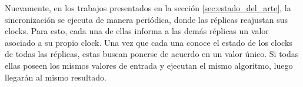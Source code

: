 


Nuevamente, en los trabajos presentados en la sección \ref{sec:estado_del_arte}, la sincronización se ejecuta de manera periódica, donde las réplicas reajustan sus clocks. Para esto, cada una de ellas informa a las demás réplicas un valor asociado a su propio clock. Una vez que cada una conoce el estado de los clocks de todas las réplicas, estas buscan ponerse de acuerdo en un valor único. Si todas ellas poseen los mismos valores de entrada y ejecutan el mismo algoritmo, luego llegarán al mismo resultado.

